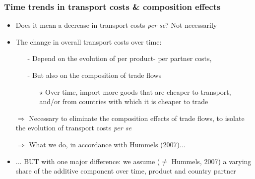 \documentclass[10 pt,Helvetica, french]{beamer}
\begin{document}
\begin{frame}
\frametitle{Time trends in transport costs \& composition effects }
\begin{itemize}
\item Does it mean a decrease in transport costs \textit{per se}? Not necessarily \vspace{0.2cm}
\pause
\item The change in overall transport costs over time: \vspace{0.1cm}
\begin{itemize}
\item[-] Depend on the evolution of per product- per partner costs, \vspace{0.1cm}
\item[-] But also on the composition of trade flows \vspace{0.1cm}
\begin{itemize}
\item[$\star$] Over time, import more goods that are cheaper to transport, and/or from countries with which it is cheaper to trade \vspace{0.1cm}
\end{itemize}
\pause
\end{itemize}
\item[$\Rightarrow$] Necessary to eliminate the composition effects of trade flows, to isolate the evolution of transport costs \textit{per se}   \vspace{0.1cm}
\item[$\Rightarrow$] What we do, in accordance with Hummels (2007)...
\pause
\item ... BUT with one major difference: we assume ($\neq$ Hummels, 2007) a varying share of the additive component over time, product and country partner
 \vspace{0.1cm}

\end{itemize}
\end{frame}

\end{document}
